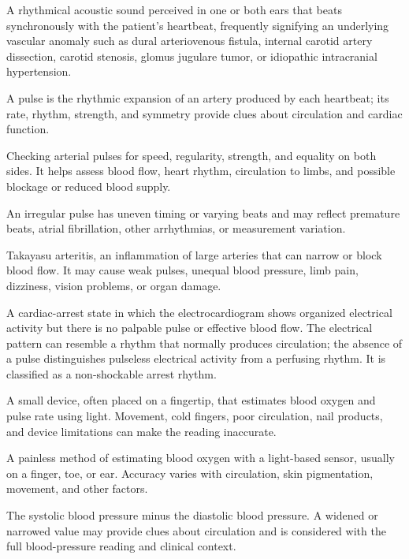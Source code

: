  A rhythmical acoustic sound perceived in one or both ears that beats synchronously with the patient's heartbeat, frequently signifying an underlying vascular anomaly such as dural arteriovenous fistula, internal carotid artery dissection, carotid stenosis, glomus jugulare tumor, or idiopathic intracranial hypertension.

 A pulse is the rhythmic expansion of an artery produced by each heartbeat; its rate, rhythm, strength, and symmetry provide clues about circulation and cardiac function.

 Checking arterial pulses for speed, regularity, strength, and equality on both sides. It helps assess blood flow, heart rhythm, circulation to limbs, and possible blockage or reduced blood supply.

 An irregular pulse has uneven timing or varying beats and may reflect premature beats, atrial fibrillation, other arrhythmias, or measurement variation.

 Takayasu arteritis, an inflammation of large arteries that can narrow or block blood flow. It may cause weak pulses, unequal blood pressure, limb pain, dizziness, vision problems, or organ damage.

 A cardiac-arrest state in which the electrocardiogram shows organized electrical activity
but there is no palpable pulse or effective blood flow. The electrical pattern can resemble a rhythm that normally
produces circulation; the absence of a pulse distinguishes pulseless electrical activity from a perfusing rhythm.
It is classified as a non-shockable arrest rhythm.

 A small device, often placed on a fingertip, that estimates blood oxygen and pulse rate using light. Movement, cold fingers, poor circulation, nail products, and device limitations can make the reading inaccurate.

 A painless method of estimating blood oxygen with a light-based sensor, usually on a finger, toe, or ear. Accuracy varies with circulation, skin pigmentation, movement, and other factors.

 The systolic blood pressure minus the diastolic blood pressure. A widened or narrowed value may provide clues about circulation and is considered with the full blood-pressure reading and clinical context.

